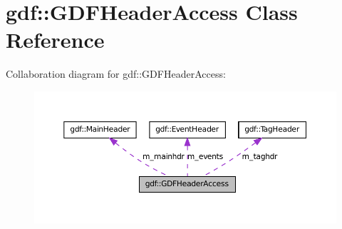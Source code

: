 \hypertarget{classgdf_1_1_g_d_f_header_access}{
\section{gdf::GDFHeaderAccess Class Reference}
\label{classgdf_1_1_g_d_f_header_access}
}


Collaboration diagram for gdf::GDFHeaderAccess:
\nopagebreak
\begin{figure}[H]
\begin{center}
\leavevmode
\includegraphics[width=398pt]{classgdf_1_1_g_d_f_header_access__coll__graph}
\end{center}
\end{figure}
